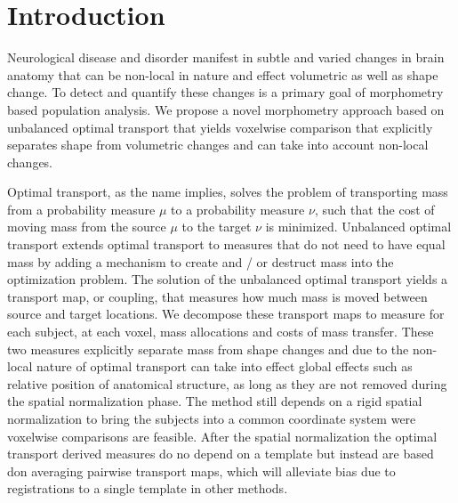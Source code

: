\documentclass{llncs}
\begin{document}
\section{Introduction}
Neurological disease and disorder manifest in subtle and varied changes in
brain anatomy that can be non-local in nature and effect volumetric as well as
shape change. To detect and quantify these changes is a primary goal of
morphometry based population analysis. We propose a novel morphometry approach
based on unbalanced optimal transport that yields voxelwise comparison that
explicitly separates shape from volumetric changes and can take into account
non-local changes. 

Optimal transport, as the name implies, solves the problem of transporting mass
from a probability measure $\mu$ to a probability measure $\nu$, such that the
cost of moving mass from the source $\mu$ to the target $\nu$ is minimized.
Unbalanced optimal transport extends optimal transport to measures that do not
need to have equal mass by adding a mechanism to create and / or destruct mass
into the optimization problem. The solution of the unbalanced optimal transport
yields a transport map, or coupling, that measures how much mass is moved
between source and target locations. We decompose these transport maps to
measure for each subject, at each voxel, mass allocations and costs of mass
transfer. These two measures explicitly separate mass from shape changes and
due to the non-local nature of optimal transport can take into effect global
effects such as relative position of anatomical structure,  as long as they are
not removed during the spatial normalization phase. The method still depends on
a rigid spatial normalization to bring the subjects into a common coordinate
system were voxelwise comparisons are feasible. After the spatial normalization
the optimal transport derived measures do no depend on a template but instead
are based don averaging pairwise transport maps, which will alleviate bias due
to registrations to a single template  in other methods. 
\end{document}
